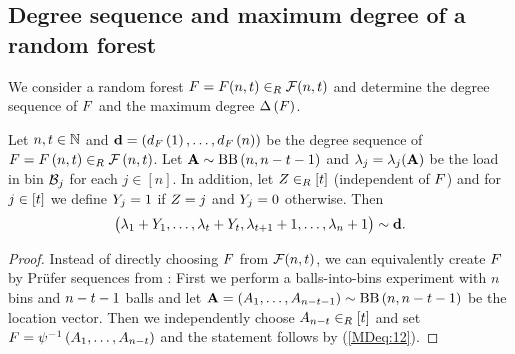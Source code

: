 \subsection{Degree sequence and maximum degree of a random forest}\label{MDsub:random_forest}
We consider a random forest $F=F(n,t)\in_R \mathcal{F}(n,t)$ and determine the degree sequence of $F$ and the maximum degree $\Delta\left(F\right)$. 

\begin{thm}\label{MDthm:forest_balls_bins}
Let $n, t\in \mathbb{N}$ and $\mathbf{d}=\left(d_{F}\left(1\right), \ldots, d_{F}\left(n\right)\right)$ be the degree sequence of $F=F\left(n, t\right)\in_R \mathcal{F}\left(n, t\right)$. Let $\mathbf{A}\sim \operatorname{BB}\left(n, n-t-1\right)$ and $\lambda_j=\lambda_j(\mathbf{A})$ be the load in bin $\mathcal{B}_j$ for each $j\in[n]$. In addition, let $Z\in_R [t]$ (independent of $F$) and for $j\in[t]$ we define $Y_j=1$ if $Z=j$ and $Y_j=0$ otherwise. Then
\begin{align*}
\big(\lambda_1+Y_1, \ldots, \lambda_t+Y_t, \lambda_{t+1}+1, \ldots, \lambda_n+1\big)\sim \mathbf{d}.
\end{align*}
\end{thm}

\begin{proof}
Instead of directly choosing $F$ from $\mathcal{F}(n,t)$, we can equivalently create $F$ by Prüfer sequences from : First we perform a balls-into-bins experiment with $n$ bins and $n-t-1$ balls and let $\mathbf{A}=\left(A_1, \ldots, A_{n-t-1}\right)\sim\operatorname{BB}\left(n, n-t-1\right)$ be the location vector. Then we independently choose $A_{n-t}\in_R [t]$ and set $F=\psi^{-1}\left(A_1, \ldots, A_{n-t}\right)$ and the statement follows by (\ref{MDeq:12}).
\end{proof}

